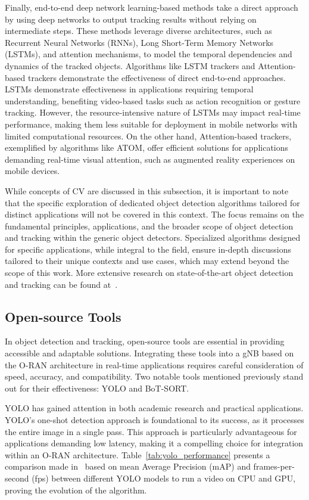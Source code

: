 Finally, end-to-end deep network learning-based methods take a direct approach by using deep networks to output tracking results without relying on intermediate steps.
These methods leverage diverse architectures, such as Recurrent Neural Networks (RNNs), Long Short-Term Memory Networks (LSTMs), and attention mechanisms, to model the temporal dependencies and dynamics of the tracked objects.
Algorithms like LSTM trackers and Attention-based trackers demonstrate the effectiveness of direct end-to-end approaches.
LSTMs demonstrate effectiveness in applications requiring temporal understanding, benefiting video-based tasks such as action recognition or gesture tracking.
However, the resource-intensive nature of LSTMs may impact real-time performance, making them less suitable for deployment in mobile networks with limited computational resources.
On the other hand, Attention-based trackers, exemplified by algorithms like ATOM, offer efficient solutions for applications demanding real-time visual attention, such as augmented reality experiences on mobile devices.

While concepts of CV are discussed in this subsection, it is important to note that the specific exploration of dedicated object detection algorithms tailored for distinct applications will not be covered in this context.
The focus remains on the fundamental principles, applications, and the broader scope of object detection and tracking within the generic object detectors.
Specialized algorithms designed for specific applications, while integral to the field, ensure in-depth discussions tailored to their unique contexts and use cases, which may extend beyond the scope of this work.
More extensive research on state-of-the-art object detection and tracking can be found at~\cite{obj_detec_SOA}.

\subsection{Open-source Tools}\label{subsec:open_tools}
In object detection and tracking, open-source tools are essential in providing accessible and adaptable solutions.
Integrating these tools into a gNB based on the O-RAN architecture in real-time applications requires careful consideration of speed, accuracy, and compatibility.
Two notable tools mentioned previously stand out for their effectiveness: YOLO and BoT-SORT\@.

YOLO\cite{YOLO} has gained attention in both academic research and practical applications.
YOLO's one-shot detection approach is foundational to its success, as it processes the entire image in a single pass.
This approach is particularly advantageous for applications demanding low latency, making it a compelling choice for integration within an O-RAN architecture.
Table~\ref{tab:yolo_performance} presents a comparison made in~\cite{YOLO_compare} based on mean Average Precision (mAP) and frames-per-second (fps) between different YOLO models to run a video on CPU and GPU, proving the evolution of the algorithm.

